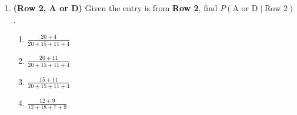 \begin{enumerate}[label=\textbf{S\arabic*.}]
\item \textbf{(Row 2, A or D)} Given the entry is from \textbf{Row 2}, find $P(\text{A or D}\mid \text{Row 2})$. 
\begin{enumerate}[label=(\Alph*)]
\item $\displaystyle \frac{20+4}{20+15+11+4}$
\item $\displaystyle \frac{20+11}{20+15+11+4}$
\item $\displaystyle \frac{15+11}{20+15+11+4}$
\item $\displaystyle \frac{12+9}{12+18+7+9}$
\end{enumerate}

\end{enumerate}


    









